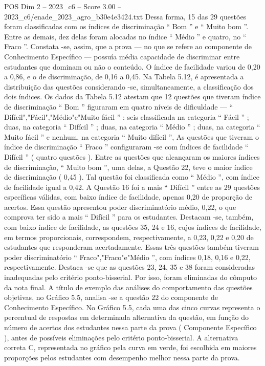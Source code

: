 \begin{textsample}{POS Dim 2 – 2023\_c6 – Score 3.00 – 2023\_c6/enade\_2023\_agro\_b30e4e3424.txt}
Dessa forma, 15 das 29 questões foram classificadas com os índices de discriminação “ Bom ” e “ Muito bom ”.
Entre as demais, dez delas foram alocadas no índice “ Médio ” e quatro, no “ Fraco ”.
Constata -se, assim, que a prova — no que se refere ao componente de Conhecimento Específico — possuía média capacidade de discriminar entre estudantes que dominam ou não o conteúdo.
O índice de facilidade variou de 0,20 a 0,86, e o de discriminação, de 0,16 a 0,45.
Na Tabela 5.12, é apresentada a distribuição das questões considerando -se, simultaneamente, a classificação dos dois índices.
Os dados da Tabela 5.12 atestam que 12 questões que tiveram índice de discriminação “ Bom ” figuraram em quatro níveis de dificuldade — “ Difícil","Fácil","Médio"e"Muito fácil ” : seis classificada na categoria “ Fácil ” ; duas, na categoria “ Difícil ” ; duas, na categoria “ Médio ” ; duas, na categoria “ Muito fácil ” e nenhum, na categoria “ Muito difícil ”, As questões que tiveram o índice de discriminação “ Fraco ” configuraram -se com índices de facilidade “ Difícil ” ( quatro questões ).
Entre as questões que alcançaram os maiores índices de discriminação, “ Muito bom ”, uma delas, a Questão 22, teve o maior índice de discriminação ( 0,45 ).
Tal questão foi classificada como “ Médio ”, com índice de facilidade igual a 0,42.
A Questão 16 foi a mais “ Difícil ” entre as 29 questões específicas válidas, com baixo índice de facilidade, apenas 0,20 de proporção de acertos.
Essa questão apresentou poder discriminatório médio, 0,22, o que comprova ter sido a mais “ Difícil ” para os estudantes.
Destacam -se, também, com baixo índice de facilidade, as questões 35, 24 e 16, cujos índices de facilidade, em termos proporcionais, correspondem, respectivamente, a 0,23, 0,22 e 0,20 de estudantes que responderam acertadamente.
Essas três questões também tiveram poder discriminatório “ Fraco","Fraco"e"Médio ”, com índices 0,18, 0,16 e 0,22, respectivamente.
Destaca -se que as questões 23, 24, 35 e 38 foram consideradas inadequadas pelo critério ponto-bisserial.
Por isso, foram eliminadas do cômputo da nota final.
A título de exemplo das análises do comportamento das questões objetivas, no Gráfico 5.5, analisa -se a questão 22 do componente de Conhecimento Específico.
No Gráfico 5.5, cada uma das cinco curvas representa o percentual de respostas em determinada alternativa da questão, em função do número de acertos dos estudantes nessa parte da prova ( Componente Específico ), antes de possíveis eliminações pelo critério ponto-bisserial.
A alternativa correta C, representada no gráfico pela curva em verde, foi escolhida em maiores proporções pelos estudantes com desempenho melhor nessa parte da prova.

\end{textsample}
